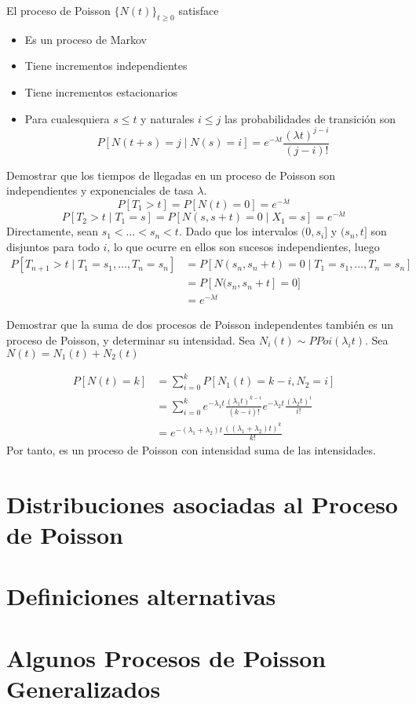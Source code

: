 \documentclass[PREyA.tex]{subfiles}
\begin{document}
\begin{prop}
El proceso de Poisson $\{N(t)\}_{t\geq 0}$ satisface
\begin{itemize}
\item Es un proceso de Markov
\item Tiene incrementos independientes
\item Tiene incrementos estacionarios
\item Para cualesquiera $s\leq t$ y naturales $i\leq j$ las probabilidades de transición son
$$
P[N(t+s)=j\mid N(s)=i] = e^{-\lambda t}\frac{(\lambda t)^{j-i}}{(j-i)!}
$$
\end{itemize}
\end{prop}
\begin{example}
Demostrar que los tiempos de llegadas en un proceso de Poisson son independientes y exponenciales de tasa $\lambda$. 
$$
P[T_1 > t] =  P[N(t) = 0] = e^{-\lambda t}
$$
$$
P[T_2 > t\mid T_1 = s] =  P[N(s,s+t) = 0\mid X_1 = s] = e^{-\lambda t}
$$
Directamente, sean $s_1<\dotsc<s_n<t$. Dado que los intervalos $(0,s_i]$ y $(s_n,t]$ son disjuntos para todo $i$, lo que ocurre en ellos son sucesos independientes, luego
\begin{align*}
P[T_{n+1} > t \mid T_1 = s_1,\dotsc, T_n = s_n] &= P[N(s_n,s_n+t)=0 \mid T_1 = s_1,\dotsc, T_n = s_n]\\
& = P[N(s_n,s_n+t] = 0]\\
&= e^{-\lambda t}
\end{align*}
\end{example}
\begin{example}
Demostrar que la suma de dos procesos de Poisson independentes también es un proceso de Poisson, y determinar su intensidad. Sea $N_i(t)\sim PPoi(\lambda_i t)$. Sea $N(t)=N_1(t)+N_2(t)$

\begin{align*}
P[N(t)= k] &= \sum_{i=0}^k P[N_1(t)=k-i,N_2=i] \\
&= \sum_{i=0}^k e^{-\lambda_1 t}\frac{(\lambda_1 t)^{k-i}}{(k-i)!}e^{-\lambda_2 t}\frac{(\lambda_2 t)^{i}}{i!}\\
&= e^{-(\lambda_1+\lambda_2)t}\frac{((\lambda_1+\lambda_2)t)^k}{k!}
\end{align*}
Por tanto, es un proceso de Poisson con intensidad suma de las intensidades.
\end{example}
\section{Distribuciones asociadas al Proceso de Poisson}
\section{Definiciones alternativas}
\section{Algunos Procesos de Poisson Generalizados}
\end{document}

